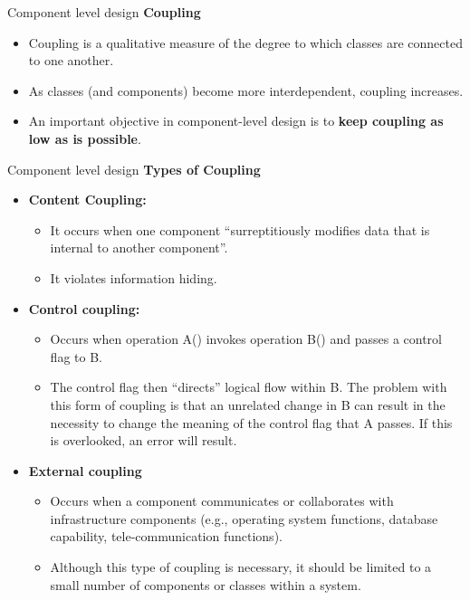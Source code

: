\documentclass{beamer}
\begin{document}
\begin{frame}{Component level design}
\textbf{Coupling}
\begin{itemize}
	\item Coupling is a qualitative measure of the degree to which classes are 
	connected to one another. 
	\item As classes (and components) become more 
	interdependent, coupling increases.
	\item  An important objective in 
	component-level design is to \textbf{keep coupling as low as is possible}.

\end{itemize}
\end{frame}
\begin{frame}{Component level design}
	\textbf{Types of Coupling}
	\begin{itemize}
		\item \textbf{Content Coupling:}
		\begin{itemize}
			\item It occurs when one component “surreptitiously modifies data that is internal to another 
			component”. 
			\item It violates information hiding.
		\end{itemize}
         	\item \textbf{Control coupling:}
         	\begin{itemize}
         		\item Occurs when operation A() invokes operation B() and 
         		passes a control flag to
         		B.
         		\item  The control flag then “directs” logical flow within B. The problem 
         		with this form of coupling is that an unrelated change in B can result 
         		in the necessity to change the meaning of the control flag that A 
         		passes. If this is overlooked, an error will result.
         	\end{itemize}
         \item \textbf{External coupling }
         \begin{itemize}
         	\item Occurs when a component communicates or 
         	collaborates with infrastructure components (e.g., operating system 
         	functions, database capability, tele-communication functions). 
         	\item Although this type of coupling is necessary, it should be limited to a 
         	small number of components or classes within a system.
         \end{itemize}
	\end{itemize}
\end{frame}
\end{document}
